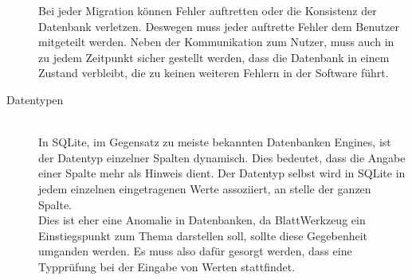 \begin{description}
Bei jeder Migration können Fehler auftretten oder die Konsistenz der Datenbank verletzen. Deswegen muss jeder auftrette Fehler dem Benutzer mitgeteilt werden. Neben der Kommunikation zum Nutzer, muss auch in zu jedem Zeitpunkt sicher gestellt werden, dass die Datenbank in einem Zustand verbleibt, die zu keinen weiteren Fehlern in der Software führt.

\item[Datentypen] \label{subsubsec03:zu_entwickeln-Datentypen} \hfill\\
In SQLite, im Gegensatz zu meiste bekannten Datenbanken Engines, ist der Datentyp einzelner Spalten dynamisch. Dies bedeutet, dass die Angabe einer Spalte mehr als Hinweis dient. Der Datentyp selbst wird in SQLite in jedem einzelnen eingetragenen Werte assoziiert, an stelle der ganzen Spalte. \\
Dies ist eher eine Anomalie in Datenbanken, da BlattWerkzeug ein Einstiegspunkt zum Thema darstellen soll, sollte diese Gegebenheit umganden werden. Es muss also dafür gesorgt werden, dass eine Typprüfung bei der Eingabe von Werten stattfindet. 

\end{description}
